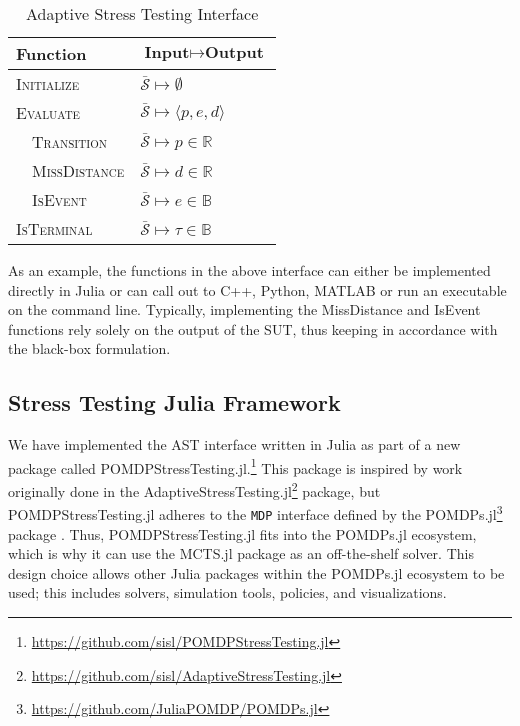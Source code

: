 \begin{table}[!h]
  \centering
  \caption{\label{tab:interface} Adaptive Stress Testing Interface}
  \begin{threeparttable}
  \begin{tabular}{@{}p{6cm}l@{}} %
    \toprule
    \textbf{Function} & \textbf{$\bm{\text{Input}\mapsto\text{Output}}$} \\
    \midrule
    \textsc{Initialize} & $\bar{\mathcal{S}} \mapsto \emptyset$ \\
    \textsc{Evaluate} & $\bar{\mathcal{S}} \mapsto \langle p, e, d \rangle$ \\
    $\quad$\textsc{Transition} & $\bar{\mathcal{S}} \mapsto p \in \mathbb{R}$ \\
    $\quad$\textsc{MissDistance} & $\bar{\mathcal{S}} \mapsto d \in \mathbb{R}$ \\
    $\quad$\textsc{IsEvent} & $\bar{\mathcal{S}} \mapsto e \in \mathbb{B}$ \\
    \textsc{IsTerminal} & $\bar{\mathcal{S}} \mapsto \tau \in \mathbb{B}$ \\
    \bottomrule
  \end{tabular}
  \end{threeparttable}
\end{table}


As an example, the functions in the above interface can either be implemented directly in Julia or can call out to C++, Python, MATLAB\textsuperscript{\textregistered} or run an executable on the command line. Typically, implementing the {\sc MissDistance} and {\sc IsEvent} functions rely solely on the output of the SUT, thus keeping in accordance with the black-box formulation.


\subsection{Stress Testing Julia Framework}
We have implemented the AST interface written in Julia as part of a new package called POMDPStressTesting.jl.\footnote{\url{https://github.com/sisl/POMDPStressTesting.jl}}
This package is inspired by work originally done in the AdaptiveStressTesting.jl\footnote{\url{https://github.com/sisl/AdaptiveStressTesting.jl}} package, but POMDPStressTesting.jl adheres to the \texttt{MDP} interface defined by the POMDPs.jl\footnote{\url{https://github.com/JuliaPOMDP/POMDPs.jl}} package  \cite{pomdps_jl}.
Thus, POMDPStressTesting.jl fits into the POMDPs.jl ecosystem, which is why it can use the MCTS.jl package as an off-the-shelf solver.
This design choice allows other Julia packages within the POMDPs.jl ecosystem to be used; this includes solvers, simulation tools, policies, and visualizations.


